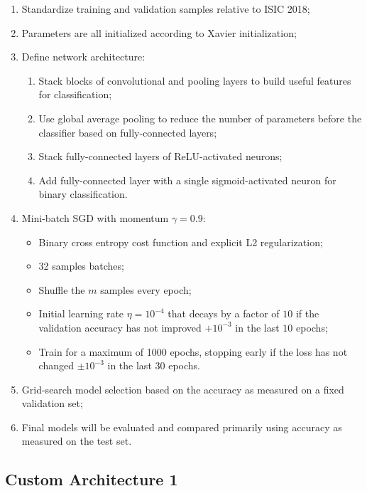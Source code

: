 \begin{enumerate}
    \item Standardize training and validation samples relative to \ac{ISIC} 2018;
    \item Parameters are all initialized according to Xavier initialization;
    \item Define network architecture:
        \begin{enumerate}
            \item Stack blocks of convolutional and pooling layers to build useful features for classification;
            \item Use global average pooling to reduce the number of parameters before the classifier based on fully-connected layers;
            \item Stack fully-connected layers of ReLU-activated neurons;
            \item Add fully-connected layer with a single sigmoid-activated neuron for binary classification.
        \end{enumerate}
    \item Mini-batch \ac{SGD} with momentum $\gamma = 0.9$:
        \begin{itemize}
            \item Binary cross entropy cost function and explicit L2 regularization;
            \item 32 samples batches;
            \item Shuffle the $m$ samples every epoch;
            \item Initial learning rate $\eta = 10^{-4}$ that decays by a factor of $10$ if the validation accuracy has not improved $+10^{-3}$ in the last $10$ epochs;
            \item Train for a maximum of 1000 epochs, stopping early if the loss has not changed $\pm 10^{-3}$ in the last $30$ epochs.
        \end{itemize}
    \item Grid-search model selection based on the accuracy as measured on a fixed validation set;
    \item Final models will be evaluated and compared primarily using accuracy as measured on the test set.
\end{enumerate}

\subsection{Custom Architecture 1}

